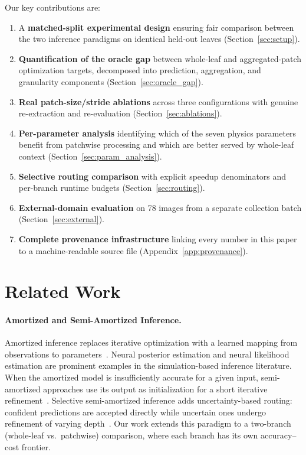 \documentclass[11pt,a4paper]{article}
\begin{document}
Our key contributions are:

\begin{enumerate}[nosep]
    \item A \textbf{matched-split experimental design} ensuring fair comparison between the two inference paradigms on identical held-out leaves (Section~\ref{sec:setup}).
    \item \textbf{Quantification of the oracle gap} between whole-leaf and aggregated-patch optimization targets, decomposed into prediction, aggregation, and granularity components (Section~\ref{sec:oracle_gap}).
    \item \textbf{Real patch-size/stride ablations} across three configurations with genuine re-extraction and re-evaluation (Section~\ref{sec:ablations}).
    \item \textbf{Per-parameter analysis} identifying which of the seven physics parameters benefit from patchwise processing and which are better served by whole-leaf context (Section~\ref{sec:param_analysis}).
    \item \textbf{Selective routing comparison} with explicit speedup denominators and per-branch runtime budgets (Section~\ref{sec:routing}).
    \item \textbf{External-domain evaluation} on 78 images from a separate collection batch (Section~\ref{sec:external}).
    \item \textbf{Complete provenance infrastructure} linking every number in this paper to a machine-readable source file (Appendix~\ref{app:provenance}).
\end{enumerate}

\section{Related Work}
\label{sec:related}

\paragraph{Amortized and Semi-Amortized Inference.}
Amortized inference replaces iterative optimization with a learned mapping from observations to parameters~\citep{cranmer2020amortized}.
Neural posterior estimation and neural likelihood estimation are prominent examples in the simulation-based inference literature.
When the amortized model is insufficiently accurate for a given input, semi-amortized approaches use its output as initialization for a short iterative refinement~\citep{radev2020bayesflow}.
Selective semi-amortized inference adds uncertainty-based routing: confident predictions are accepted directly while uncertain ones undergo refinement of varying depth~\citep{geifman2019selectivenet}.
Our work extends this paradigm to a two-branch (whole-leaf vs.\ patchwise) comparison, where each branch has its own accuracy--cost frontier.
\end{document}
